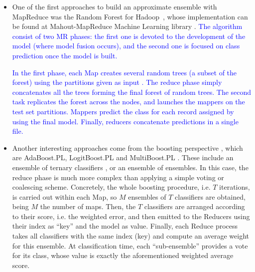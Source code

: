 \documentclass[3p,review]{elsarticle}
\begin{document}
	\begin{itemize}
		\item One of the first approaches to build an approximate ensemble with MapReduce was the Random Forest for Hadoop~\cite{Assun13-RF-H,Wang13-RF-H}, whose implementation can be found at Mahout-MapReduce Machine Learning library \cite{Owe11, Mahout17}. \textcolor{blue}{The algorithm consist of two MR phases: the first one is devoted to the development of the model (where model fusion occurs), and the second one is focused on class prediction once the model is built.}
		
		\textcolor{blue}{In the first phase, each Map creates several random trees (a subset of the forest) using the partitions given as input \cite{Rokach16}. The reduce phase simply concatenates all the trees forming the final forest of random trees. The second task replicates the forest across the nodes, and launches the mappers on the test set partitions. Mappers predict the class for each record assigned by using the final model. Finally, reducers concatenate predictions in a single file.}
		
		
		
		\item Another interesting approaches come from the boosting perspective \cite{schapire99brief}, which are AdaBoost.PL, LogitBoost.PL and MultiBoost.PL \cite{Palit12-Boost}. These include an ensemble of ternary classifiers \cite{schapire99confidence}, or an ensemble of ensembles. In this case, the reduce phase is much more complex than applying a simple voting or coalescing scheme. Concretely, the whole boosting procedure, i.e. $T$ iterations, is carried out within each Map, so $M$ ensembles of $T$ classifiers are obtained, being $M$ the number of maps. Then, the $T$ classifiers are arranged according to their score, i.e. the weighted error, and then emitted to the Reducers using their index as ``key'' and the model as value. Finally, each Reduce process takes all classifiers with the same index (key) and compute an average weight for this ensemble. At classification time, each ``sub-ensemble'' provides a vote for its class, whose value is exactly the aforementioned weighted average score.  
		

\end{itemize}
\end{document}
